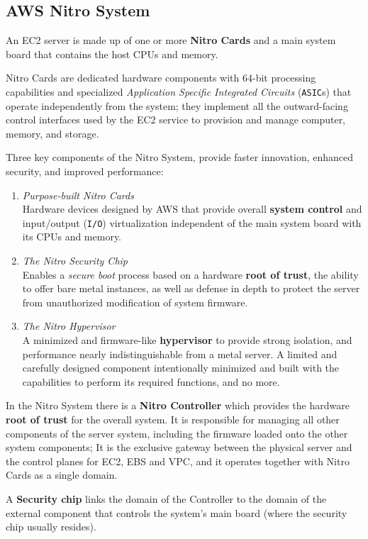 \subsection{AWS Nitro System}
An EC2 server is made up of one or more \textbf{Nitro Cards} and a main system
board that contains the host CPUs and memory.

Nitro Cards are dedicated hardware components with 64-bit processing
capabilities and specialized \textit{Application Specific Integrated Circuits}
(\texttt{ASIC}s) that operate independently from the system; 
they implement all the outward-facing control interfaces used by the EC2 service to provision and manage computer, memory, and storage.

Three key components of the Nitro System, provide faster innovation, enhanced
security, and improved performance:
\begin{enumerate}
   \item \textit{Purpose-built Nitro Cards}\\
   Hardware devices designed by AWS that
   provide overall \textbf{system control} and input/output (\texttt{I/O}) virtualization
   independent of the main system board with its CPUs and memory.
   \item \textit{The Nitro Security Chip}\\
   Enables a \textit{secure boot} process based on a
   hardware \textbf{root of trust}, the ability to offer bare metal instances, as well as
   defense in depth to protect the server from unauthorized modification of
   system firmware.
   \item \textit{The Nitro Hypervisor}\\
   A minimized and firmware-like \textbf{hypervisor} to
   provide strong isolation, and performance nearly indistinguishable from a metal server.
   A limited and carefully designed component intentionally minimized and built with the capabilities to perform its required functions, and no more.
\end{enumerate}

In the Nitro System there is a \textbf{Nitro Controller} which provides the hardware \textbf{root of trust} for the overall system.
It is responsible for
managing all other components of the server system, including the firmware
loaded onto the other system components;
It is the exclusive gateway between the physical server and the control planes for EC2, EBS and VPC, 
and it operates together with Nitro Cards as a single domain.

A \textbf{Security chip} links the domain of the Controller to the domain of the external component that controls the system's main board (where the security chip usually resides).